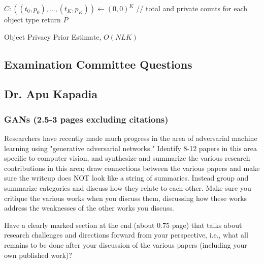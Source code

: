\documentclass[11pt]{article}
\begin{document}
\begin{appendices}
\begin{algorithm}[hp!]\label{alg:private}
\tiny
	$C: ((t_0, p_0), \dots, (t_K, p_K)) \leftarrow (0,0)^K$ // total and private counts for each object type\;
	return $P$\;
\caption{Object Privacy Prior Estimate, $O(NL  K)$}
\end{algorithm}


\newpage
\begin{center}
    \section{Examination Committee Questions}
\end{center}

\subsection{Dr. Apu Kapadia}

\subsubsection{GANs (2.5-3 pages excluding citations)}
Researchers have recently made much progress in the area of adversarial machine learning using "generative adversarial networks." Identify 8-12 papers in this area specific to computer vision, and synthesize and summarize the various research contributions in this area; draw connections between the various papers and make sure the writeup does NOT look like a string of summaries. Instead group and summarize categories and discuss how they relate to each other.  Make sure you critique the various works when you discuss them, discussing how these works address the weaknesses of the other works you discuss. 

Have a clearly marked section at the end (about 0.75 page) that talks about research challenges and directions forward from your perspective, i.e., what all remains to be done after your discussion of the various papers (including your own published work)?


\end{appendices}
\end{document}
